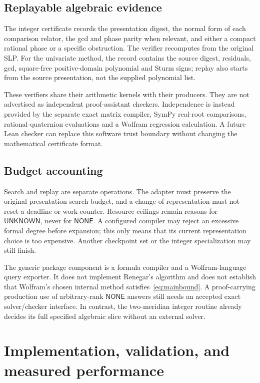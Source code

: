 \documentclass[11pt]{article}
\theoremstyle{definition}
\theoremstyle{remark}
\newcommand{\NO}{\mathsf{NONE}}
\newcommand{\UN}{\mathsf{UNKNOWN}}
\begin{document}
\subsection{Replayable algebraic evidence}
The integer certificate records the presentation digest, the normal form of each comparison relator, the gcd and phase parity when relevant, and either a compact rational phase or a specific obstruction. The verifier recomputes from the original SLP. For the univariate method, the record contains the source digest, residuals, gcd, square-free positive-domain polynomial and Sturm signs; replay also starts from the source presentation, not the supplied polynomial list.

These verifiers share their arithmetic kernels with their producers. They are not advertised as independent proof-assistant checkers. Independence is instead provided by the separate exact matrix compiler, SymPy real-root comparisons, rational-quaternion evaluations and a Wolfram regression calculation. A future Lean checker can replace this software trust boundary without changing the mathematical certificate format.

\subsection{Budget accounting}
Search and replay are separate operations. The adapter must preserve the original presentation-search budget, and a change of representation must not reset a deadline or work counter. Resource ceilings remain reasons for $\UN$, never for $\NO$. A configured compiler may reject an excessive formal degree before expansion; this only means that its current representation choice is too expensive. Another checkpoint set or the integer specialization may still finish.

The generic package component is a formula compiler and a Wolfram-language query exporter. It does not implement Renegar's algorithm and does not establish that Wolfram's chosen internal method satisfies~\eqref{eq:mainbound}. A proof-carrying production use of arbitrary-rank $\NO$ answers still needs an accepted exact solver/checker interface. In contrast, the two-meridian integer routine already decides its full specified algebraic slice without an external solver.

\section{Implementation, validation, and measured performance}
\label{sec:experiments}
\end{document}
